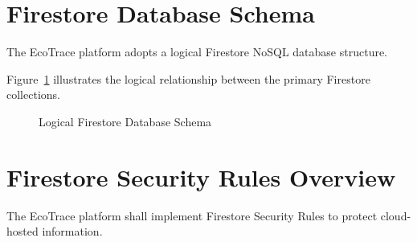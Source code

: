 \section{Firestore Database Schema}
\label{sec:database-schema}

The EcoTrace platform adopts a logical Firestore NoSQL database
structure.

Figure~\ref{fig:firestore_schema} illustrates the logical relationship
between the primary Firestore collections.

\begin{figure}[H]
\centering


\caption{Logical Firestore Database Schema}

\label{fig:firestore_schema}

\end{figure}

\section{Firestore Security Rules Overview}

The EcoTrace platform shall implement Firestore Security Rules to
protect cloud-hosted information.

